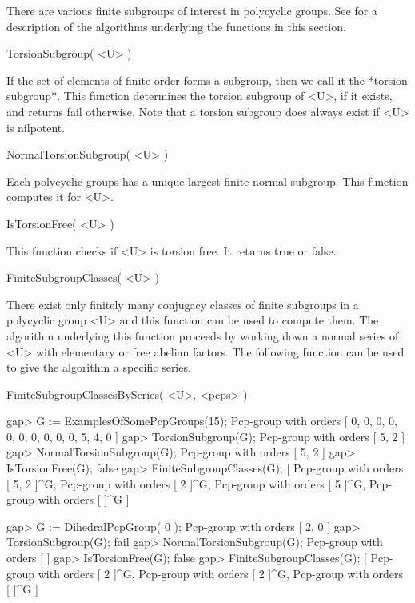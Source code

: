 
There are various finite subgroups of interest in polycyclic groups. See
\cite{Eic00} for a description of the algorithms underlying the functions
in this section.

\> TorsionSubgroup( <U> )

If the set of elements of finite order forms a subgroup, then we call
it the *torsion subgroup*. This function determines the torsion subgroup
of <U>, if it exists, and returns fail otherwise. Note that a torsion
subgroup does always exist if <U> is nilpotent.

\> NormalTorsionSubgroup( <U> )

Each polycyclic groups has a unique largest finite normal subgroup.
This function computes it for <U>. 

\> IsTorsionFree( <U> )

This function checks if <U> is torsion free. It returns true or false.

\> FiniteSubgroupClasses( <U> )

There exist only finitely many conjugacy classes of finite subgroups
in a polycyclic group <U> and this function can be used to compute
them. The algorithm underlying this function proceeds by working down
a normal series of <U> with elementary or free abelian factors. The
following function can be used to give the algorithm a specific series.

\> FiniteSubgroupClassesBySeries( <U>, <pcps> )

\beginexample
gap> G := ExamplesOfSomePcpGroups(15);
Pcp-group with orders [ 0, 0, 0, 0, 0, 0, 0, 0, 0, 0, 5, 4, 0 ]
gap> TorsionSubgroup(G);
Pcp-group with orders [ 5, 2 ]
gap> NormalTorsionSubgroup(G);
Pcp-group with orders [ 5, 2 ]
gap> IsTorsionFree(G);
false
gap> FiniteSubgroupClasses(G);
[ Pcp-group with orders [ 5, 2 ]^G,
  Pcp-group with orders [ 2 ]^G,
  Pcp-group with orders [ 5 ]^G,
  Pcp-group with orders [  ]^G ]

gap> G := DihedralPcpGroup( 0 );
Pcp-group with orders [ 2, 0 ]
gap> TorsionSubgroup(G);
fail
gap> NormalTorsionSubgroup(G);
Pcp-group with orders [  ]
gap> IsTorsionFree(G);
false
gap> FiniteSubgroupClasses(G);
[ Pcp-group with orders [ 2 ]^G,
  Pcp-group with orders [ 2 ]^G,
  Pcp-group with orders [  ]^G ]
\endexample


